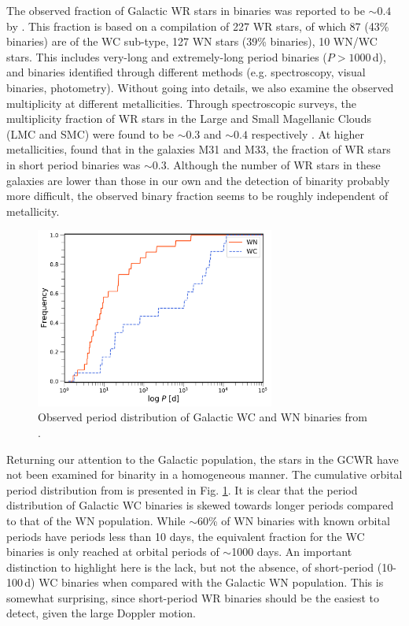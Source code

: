 The observed fraction of Galactic WR stars in binaries was reported to be ${\sim}0.4$ by  . This fraction is based on a compilation of 227 WR stars, of which 87 (43\% binaries) are of the WC sub-type, 127 WN stars (39\% binaries), 10 WN/WC stars. This includes very-long and extremely-long period binaries ($P>1000\,$d), and binaries identified through different methods (e.g. spectroscopy, visual binaries, photometry). Without going into details, we also examine the observed multiplicity at different metallicities. Through spectroscopic surveys, the multiplicity fraction of WR stars in the Large and Small Magellanic Clouds (LMC and SMC) were found to be ${\sim}0.3$ and ${\sim}0.4$ respectively \citep{bartzakos_magellanic_2001,foellmi_wolf-rayet_2003,foellmi_wolf-rayet_2003-1,schnurr_spectroscopic_2008}. At higher metallicities, \citet{neugent_close_2014} found that in the galaxies M31 and M33, the fraction of WR stars in short period binaries was ${\sim}0.3$. Although the number of WR stars in these galaxies are lower than those in our own and the detection of binarity probably more difficult, the observed binary fraction seems to be roughly independent of metallicity.


\begin{figure}
    \centering
    \includegraphics[width=0.7\textwidth]{chapters/introduction/image/Cumulative_pobs_withdust.pdf}
    \caption{Observed period distribution of Galactic WC and WN binaries from .}
    \label{fig:obs_pdist}
\end{figure}

Returning our attention to the Galactic population, the stars in the GCWR have not been examined for binarity in a homogeneous manner. The cumulative orbital period distribution from  is presented in Fig. \ref{fig:obs_pdist}. It is clear that the period distribution of Galactic WC binaries is skewed towards longer periods compared to that of the WN population. While ${\sim}60$\% of WN binaries with known orbital periods have periods less than 10 days, the equivalent fraction for the WC binaries is only reached at orbital periods of ${\sim}$1000 days. An important distinction to highlight here is the lack, but not the absence, of short-period (10-100\,d) WC binaries when compared with the Galactic WN population. This is somewhat surprising, since short-period WR binaries should be the easiest to detect, given the large Doppler motion.

